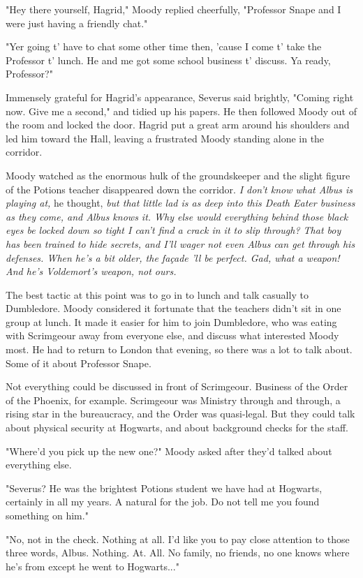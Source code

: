 \documentclass[a4paper,11pt]{article}
\begin{document}
"Hey there yourself, Hagrid," Moody replied cheerfully, "Professor Snape and I were just having a friendly chat."

"Yer going t' have to chat some other time then, 'cause I come t' take the Professor t' lunch. He and me got some school business t' discuss. Ya ready, Professor?"

Immensely grateful for Hagrid's appearance, Severus said brightly, "Coming right now. Give me a second," and tidied up his papers. He then followed Moody out of the room and locked the door. Hagrid put a great arm around his shoulders and led him toward the Hall, leaving a frustrated Moody standing alone in the corridor.

Moody watched as the enormous hulk of the groundskeeper and the slight figure of the Potions teacher disappeared down the corridor. \emph{I don't know what Albus is playing at,} he thought, \emph{but that little lad is as deep into this Death Eater business as they come, and Albus knows it. Why else would everything behind those black eyes be locked down so tight I can't find a crack in it to slip through? That boy has been trained to hide secrets, and I'll wager not even Albus can get through his defenses. When he's a bit older, the façade 'll be perfect. Gad, what a weapon! And he's Voldemort's weapon, not ours.}

The best tactic at this point was to go in to lunch and talk casually to Dumbledore. Moody considered it fortunate that the teachers didn't sit in one group at lunch. It made it easier for him to join Dumbledore, who was eating with Scrimgeour away from everyone else, and discuss what interested Moody most. He had to return to London that evening, so there was a lot to talk about. Some of it about Professor Snape.

Not everything could be discussed in front of Scrimgeour. Business of the Order of the Phoenix, for example. Scrimgeour was Ministry through and through, a rising star in the bureaucracy, and the Order was quasi-legal. But they could talk about physical security at Hogwarts, and about background checks for the staff.

"Where'd you pick up the new one?" Moody asked after they'd talked about everything else.

"Severus? He was the brightest Potions student we have had at Hogwarts, certainly in all my years. A natural for the job. Do not tell me you found something on him."

"No, not in the check. Nothing at all. I'd like you to pay close attention to those three words, Albus. Nothing. At. All. No family, no friends, no one knows where he's from except he went to Hogwarts..."
\end{document}
